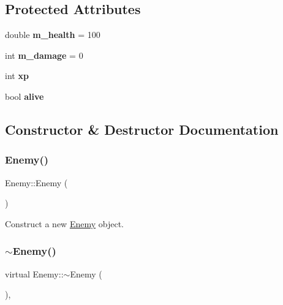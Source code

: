 \subsection*{Protected Attributes}
\begin{DoxyCompactItemize}
\item 
\mbox{\label{classEnemy_af7da86e74d41308bc6378bf0223a5fb5}} 
double {\bfseries m\+\_\+health} = 100
\item 
\mbox{\label{classEnemy_a2fbf89783c994b155b825563a6c51fc5}} 
int {\bfseries m\+\_\+damage} = 0
\item 
\mbox{\label{classEnemy_a6c93c0e43d21c5198797b386b6140848}} 
int {\bfseries xp}
\item 
\mbox{\label{classEnemy_a26c34811424e665a6c2efb9100cae0d8}} 
bool {\bfseries alive}
\end{DoxyCompactItemize}


\subsection{Constructor \& Destructor Documentation}
\mbox{\label{classEnemy_a94f30d348b6d2840fd71675472ba38dd}} 
\subsubsection{\texorpdfstring{Enemy()}{Enemy()}}
{\footnotesize\ttfamily Enemy\+::\+Enemy (\begin{DoxyParamCaption}{ }\end{DoxyParamCaption})}



Construct a new \mbox{\hyperlink{classEnemy}{Enemy}} object. 

\mbox{\label{classEnemy_aafb628c66008e33afdd750e2f492bd98}} 
\subsubsection{\texorpdfstring{$\sim$Enemy()}{~Enemy()}}
{\footnotesize\ttfamily virtual Enemy\+::$\sim$\+Enemy (\begin{DoxyParamCaption}{ }\end{DoxyParamCaption})\hspace{0.3cm}{\ttfamily [virtual]}, {\ttfamily [default]}}



